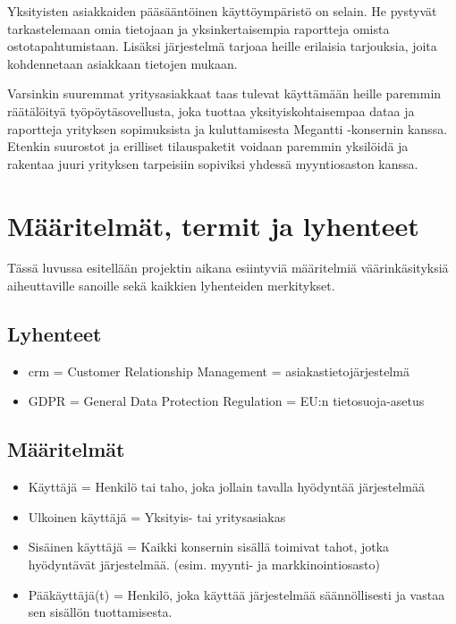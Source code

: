         Yksityisten asiakkaiden pääsääntöinen käyttöympäristö on selain. He pystyvät tarkastelemaan omia tietojaan ja yksinkertaisempia raportteja omista 
        ostotapahtumistaan. Lisäksi järjestelmä tarjoaa heille erilaisia tarjouksia, joita kohdennetaan asiakkaan tietojen mukaan.

        Varsinkin suuremmat yritysasiakkaat taas tulevat käyttämään heille paremmin räätälöityä työpöytäsovellusta, joka tuottaa yksityiskohtaisempaa
        dataa ja raportteja yrityksen sopimuksista ja kuluttamisesta Megantti -konsernin kanssa. Etenkin suurostot ja erilliset tilauspaketit 
        voidaan paremmin yksilöidä ja rakentaa juuri yrityksen tarpeisiin sopiviksi yhdessä myyntiosaston kanssa.


\section{Määritelmät, termit ja lyhenteet}

    Tässä luvussa esitellään projektin aikana esiintyviä määritelmiä väärinkäsityksiä aiheuttaville sanoille sekä kaikkien lyhenteiden merkitykset.

    \subsection{Lyhenteet}
        \begin{itemize}
		\item \gls{crm} = Customer Relationship Management = asiakastietojärjestelmä
            \item GDPR = General Data Protection Regulation = EU:n tietosuoja-asetus
            
        \end{itemize}

    \subsection{Määritelmät}
        \begin{itemize}
            \item Käyttäjä = Henkilö tai taho, joka jollain tavalla hyödyntää järjestelmää
            \item Ulkoinen käyttäjä = Yksityis- tai yritysasiakas
            \item Sisäinen käyttäjä = Kaikki konsernin sisällä toimivat tahot, jotka hyödyntävät järjestelmää. (esim. myynti- ja markkinointiosasto)
            \item Pääkäyttäjä(t) = Henkilö, joka käyttää järjestelmää säännöllisesti ja vastaa sen sisällön tuottamisesta.
            
        \end{itemize}

    

